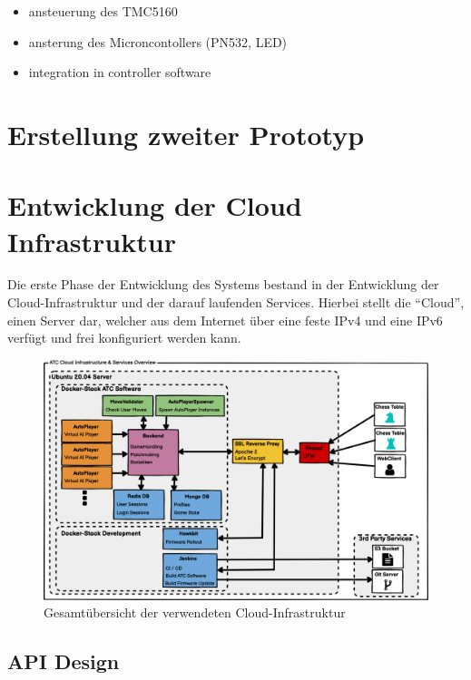 \begin{itemize}
\tightlist
\item
  ansteuerung des TMC5160
\item
  ansterung des Microncontollers (PN532, LED)
\item
  integration in controller software
\end{itemize}

\hypertarget{erstellung-zweiter-prototyp}{%
\section{Erstellung zweiter
Prototyp}\label{erstellung-zweiter-prototyp}}

\hypertarget{entwicklung-der-cloud-infrastruktur}{%
\section{Entwicklung der Cloud
Infrastruktur}\label{entwicklung-der-cloud-infrastruktur}}

Die erste Phase der Entwicklung des Systems bestand in der Entwicklung
der Cloud-Infrastruktur und der darauf laufenden Services. Hierbei
stellt die ``Cloud'', einen Server dar, welcher aus dem Internet über
eine feste IPv4 und eine IPv6 verfügt und frei konfiguriert werden kann.

\begin{figure}
\centering
\includegraphics{images/ATC_Cloud_Architecture.png}
\caption{Gesamtübersicht der verwendeten Cloud-Infrastruktur}
\end{figure}

\hypertarget{api-design}{%
\subsection{API Design}\label{api-design}}

